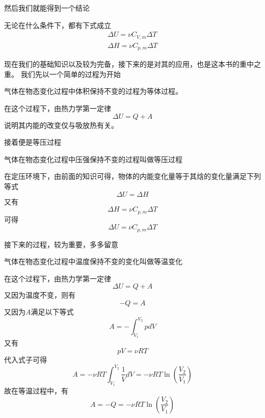 \documentclass[lang=cn,10pt]{elegantbook}
\begin{document}
	然后我们就能得到一个结论
	\begin{conclusion}
		无论在什么条件下，都有下式成立
		\begin{equation*}
			\begin{split}
				\varDelta U=\nu C_{V,m}\varDelta T
				\\
				\varDelta H=\nu C_{p,m}\varDelta T
			\end{split}
		\end{equation*}
	\end{conclusion}
	现在我们的基础知识以及较为完备，接下来的是对其的应用，也是这本书的重中之重。
	我们先以一个简单的过程为开始
	
	\begin{definition}[等体过程]
		气体在物态变化过程中体积保持不变的过程为等体过程。
	\end{definition}
	在这个过程下，由热力学第一定律
	\begin{equation*}
		\varDelta U=Q+A 
	\end{equation*}
	说明其内能的改变仅与吸放热有关。
	
	接着便是等压过程
	\begin{definition}[等压过程]
		气体在物态变化过程中压强保持不变的过程叫做等压过程
	\end{definition}
	在定压环境下，由前面的知识可得，物体的内能变化量等于其焓的变化量满足下列等式
	\begin{equation*}
		\varDelta U=\varDelta H
	\end{equation*}
	又有
	\begin{equation*}
		\varDelta H=\nu C_{p,m}\varDelta T
	\end{equation*}
	可得
	\begin{equation*}
		\varDelta U=\nu C_{p,m}\varDelta T
	\end{equation*}
	
	接下来的过程，较为重要，多多留意
	\begin{definition}[等温过程]
		气体在物态变化过程中温度保持不变的变化叫做等温变化
	\end{definition}
	在这个过程下，由热力学第一定律
	\begin{equation*}
		\varDelta U=Q+A 
	\end{equation*}
	又因为温度不变，则有
	\begin{equation*}
		-Q=A 
	\end{equation*}
	又因为$A$满足以下等式
	\begin{equation*}
		A=-\int_{V_1}^{V_2}{pdV}
	\end{equation*}
	又有
	\begin{equation*}
		pV=\nu RT
	\end{equation*}
	代入式子可得
	\begin{equation*}
	A=-\nu RT\int_{V_1}^{V_2}{\frac{1}{V}dV}=-\nu RT\ln(\frac{V_{2}}{V_{1}})
	\end{equation*}
	故在等温过程中，有
	\begin{equation*}
		A=-Q=-\nu RT\ln(\frac{V_{2}}{V_{1}}) 
	\end{equation*}
	
\end{document}

